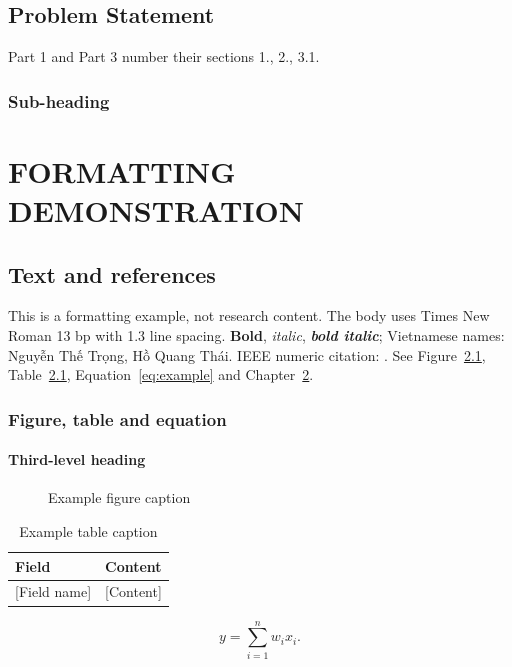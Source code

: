 \documentclass{template/ctu-thesis}
\begin{document}
\tableofcontents
\listoffigures
\listoftables
{}
\ThesisFlatNumbering
\section{Problem Statement}
Part 1 and Part 3 number their sections 1., 2., 3.1.
\subsection{Sub-heading}
\ThesisChapterNumbering
{}
\chapter{FORMATTING DEMONSTRATION}\label{chap:example}
\section{Text and references}
This is a formatting example, not research content.
The body uses Times New Roman 13 bp with 1.3 line spacing.
\textbf{Bold}, \textit{italic}, \textbf{\textit{bold italic}}; Vietnamese names:
Nguyễn Thế Trọng, Hồ Quang Thái.
IEEE numeric citation: \citep{example-reference}.
See Figure~\ref{fig:example}, Table~\ref{tab:example}, Equation~\eqref{eq:example}
and Chapter~\ref{chap:example}.
\subsection{Figure, table and equation}
\subsubsection{Third-level heading}
\begin{figure}[htbp]
  \centering
  \caption{Example figure caption}\label{fig:example}
\end{figure}
\begin{table}[htbp]
  \centering
  \caption{Example table caption}\label{tab:example}
  \begin{tabularx}{.85\textwidth}{|l|X|}
    \hline \textbf{Field} & \textbf{Content} \\ \hline
    {}[Field name] & [Content] \\ \hline
  \end{tabularx}
\end{table}
\begin{equation}\label{eq:example}
  y = \sum_{i=1}^{n} w_i x_i.
\end{equation}
\end{document}
